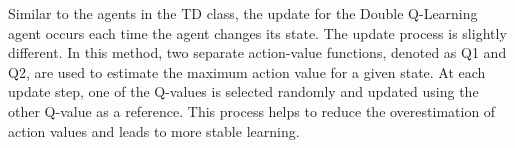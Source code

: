 Similar to the agents in the TD class, the update for the Double Q-Learning agent occurs each time the agent changes its state. The update process is slightly different. In this method, two separate action-value functions, denoted as Q1 and Q2, are used to estimate the maximum action value for a given state. At each update step, one of the Q-values is selected randomly and updated using the other Q-value as a reference. This process helps to reduce the overestimation of action values and leads to more stable learning.